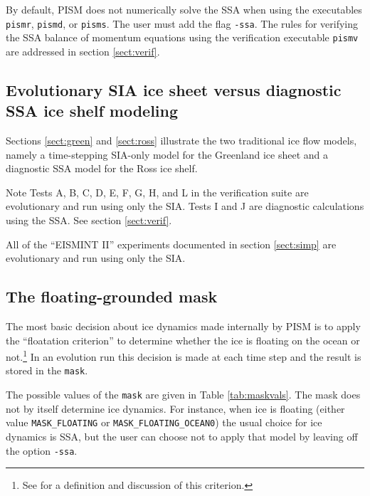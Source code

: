 \documentclass[11pt,final]{amsart}
\renewcommand{\t}[1]{\texttt{#1}}
\newcommand{\pismoptionindex}[1]{\index{options for PISM (and PETSc)!\texttt{-#1}}}
\newcommand{\intextoption}[1]{\texttt{-#1}\pismoptionindex{#1}}
\begin{document}
By default, PISM does not numerically solve the SSA when using the executables \verb|pismr|, \verb|pismd|, or \verb|pisms|.  The user must add the flag \intextoption{ssa}.  The rules for verifying the SSA balance of momentum equations using the verification executable \verb|pismv| are addressed in section \ref{sect:verif}.


\subsection{Evolutionary SIA ice sheet versus diagnostic SSA ice shelf modeling} \label{subsect:basicmodes}  Sections \ref{sect:green} and \ref{sect:ross} illustrate the two traditional ice flow models, namely a time-stepping SIA-only model for the Greenland ice sheet and a diagnostic SSA model for the Ross ice shelf.

Note Tests A, B, C, D, E, F, G, H, and L in the verification suite are evolutionary and run using only the SIA.  Tests I and J are diagnostic calculations using the SSA.  See section \ref{sect:verif}.

All of the ``EISMINT II'' experiments documented in section \ref{sect:simp} are evolutionary and run using only the SIA.


\subsection{The floating-grounded mask} \label{subsect:mask}  The most basic decision about ice dynamics made internally by PISM is to apply the ``floatation criterion'' to determine whether the ice is floating on the ocean or not.\footnote{See \cite{WeisGreveHutter} for a definition and discussion of this criterion.}  In an evolution run this decision is made at each time step and the result is stored in the \t{mask}.

The possible values of the \t{mask} are given in Table \ref{tab:maskvals}.  The mask does not by itself determine ice dynamics.  For instance, when ice is floating (either value \verb|MASK_FLOATING| or \verb|MASK_FLOATING_OCEAN0|) the usual choice for ice dynamics is SSA, but the user can choose not to apply that model by leaving off the option \verb|-ssa|.
\end{document}
